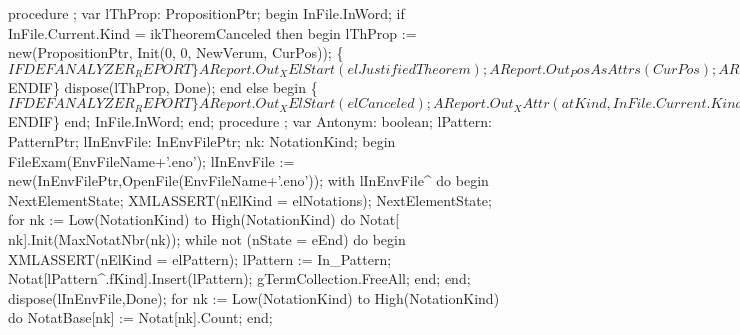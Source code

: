 procedure ;
var
   lThProp: PropositionPtr;
begin
   InFile.InWord;
   if InFile.Current.Kind = ikTheoremCanceled then
   begin
      lThProp := new(PropositionPtr, Init(0, 0, NewVerum, CurPos));
      \{$IFDEF ANALYZER_REPORT\}
      AReport.Out_XElStart(elJustifiedTheorem);
      AReport.Out_PosAsAttrs(CurPos);
      AReport.Out_XAttrEnd;
      AReport.Out_Proposition(lThProp);
      AReport.Out_XEl1(elSkippedProof);
      AReport.Out_XElEnd(elJustifiedTheorem);
      \{$ENDIF\}
      dispose(lThProp, Done);
   end
   else
   begin
      \{$IFDEF ANALYZER_REPORT\}
      AReport.Out_XElStart(elCanceled);
      AReport.Out_XAttr(atKind, InFile.Current.Kind);
      AReport.Out_XElEnd0;
      \{$ENDIF\}
   end;
   InFile.InWord;
end;
\eatline
{}\nwendcode{}\nwdocspar
\nwenddocs{}\endmoddef\nwstartdeflinemarkup{}\nwenddeflinemarkup
procedure ;
var
   Antonym: boolean;
   lPattern: PatternPtr;
   lInEnvFile: InEnvFilePtr;
   nk: NotationKind;
begin
   FileExam(EnvFileName+'.eno');
   lInEnvFile := new(InEnvFilePtr,OpenFile(EnvFileName+'.eno'));
   with lInEnvFile^ do
   begin
      NextElementState;
      XMLASSERT(nElKind = elNotations);
      NextElementState;
      for nk := Low(NotationKind) to High(NotationKind) do
         Notat[ nk].Init(MaxNotatNbr(nk));
      while not (nState = eEnd) do
      begin
         XMLASSERT(nElKind = elPattern);
         lPattern := In_Pattern;
         Notat[lPattern^.fKind].Insert(lPattern);
         gTermCollection.FreeAll;
      end;
   end;
   dispose(lInEnvFile,Done);
   for nk := Low(NotationKind) to High(NotationKind) do
      NotatBase[nk] := Notat[nk].Count;
end;
\eatline
{}\nwendcode{}\nwdocspar
\nwenddocs{}\endmoddef\nwstartdeflinemarkup{}\nwenddeflinemarkup

